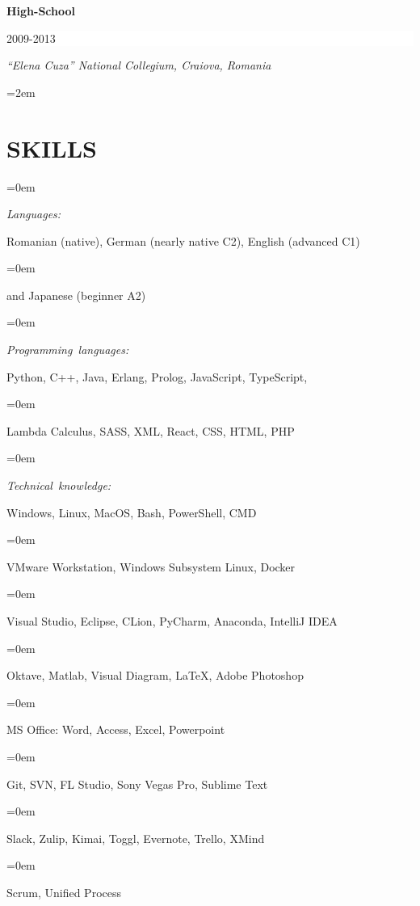 \documentclass[paper=a4,fontsize=10.47pt]{scrartcl} %
\newlength{\spacebox}
\newcommand{\sepspace}{\vspace*{0.5em}}		%
\newcommand{\NewPart}[1]{\section*{\uppercase{#1}}}
\newcommand{\PersonalEntry}[2]{
		\noindent\hangindent=0em\hangafter=0 %
		\parbox{\spacebox}{        %
		\mbox {\textit{#1}}}		       %
		\hspace{5em} #2 \par}    %
\newcommand{\SkillsEntry}[2]{      %
		\noindent\hangindent=0em\hangafter=0 %
		\parbox{\spacebox}{        %
		\mbox{\textit{#1}}}			   %
		\hspace{6em} #2 \par}    %
\newcommand{\EducationEntry}[4]{
		\noindent \textbf{#1} \hfill      %
		\colorbox{White}{%
			\parbox{16em}{%
			\hfill\color{Black}#2}} \par  %
		\noindent \textit{#3} \par        %
		\noindent\hangindent=2em\hangafter=0 \small #4 %
		\normalsize \par}
\begin{document}
 \sepspace

\EducationEntry{\color[HTML]{6a040f}High-School}{2009-2013}{“Elena Cuza” National Collegium, Craiova, Romania}{%
}





\NewPart{Skills}{}

\SkillsEntry{Languages:}{Romanian (native), German (nearly native C2), English (advanced C1) }
\SkillsEntry{}{and Japanese (beginner A2)}

\sepspace

\SkillsEntry{Programming languages:}{Python, C++, Java, Erlang, Prolog, JavaScript, TypeScript,}
\SkillsEntry{}{Lambda Calculus, SASS, XML, React, CSS, HTML, PHP}

\sepspace

\SkillsEntry{Technical knowledge:}{Windows, Linux, MacOS, Bash, PowerShell, CMD} 
\SkillsEntry{}{VMware Workstation, Windows Subsystem Linux, Docker}
\SkillsEntry{}{Visual Studio, Eclipse, CLion, PyCharm, Anaconda, IntelliJ IDEA}

\SkillsEntry{}{Oktave, Matlab, Visual Diagram, \LaTeX, Adobe Photoshop}
\SkillsEntry{}{MS Office: Word, Access, Excel, Powerpoint}
\SkillsEntry{}{Git, SVN, FL Studio, Sony Vegas Pro, Sublime Text}
\SkillsEntry{}{Slack, Zulip, Kimai, Toggl, Evernote, Trello, XMind}
\SkillsEntry{}{Scrum, Unified Process}



%
\end{document}
